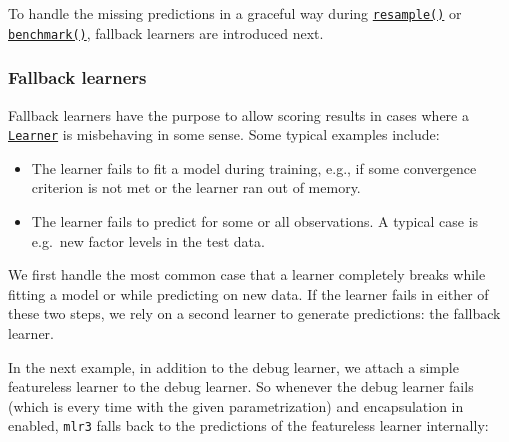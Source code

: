 \documentclass[]{article}
\newenvironment{Shaded}{\begin{snugshade}}{\end{snugshade}}
\newcommand{\DataTypeTok}[1]{\textcolor[rgb]{0.13,0.29,0.53}{#1}}
\newcommand{\DecValTok}[1]{\textcolor[rgb]{0.00,0.00,0.81}{#1}}
\newcommand{\KeywordTok}[1]{\textcolor[rgb]{0.13,0.29,0.53}{\textbf{#1}}}
\newcommand{\NormalTok}[1]{#1}
\newcommand{\OperatorTok}[1]{\textcolor[rgb]{0.81,0.36,0.00}{\textbf{#1}}}
\newcommand{\StringTok}[1]{\textcolor[rgb]{0.31,0.60,0.02}{#1}}
\providecommand{\tightlist}{%
  \setlength{\itemsep}{0pt}\setlength{\parskip}{0pt}}
\renewenvironment{Shaded} {\begin{snugshade}\small} {\end{snugshade}}
\begin{document}
To handle the missing predictions in a graceful way during \href{https://mlr3.mlr-org.com/reference/resample.html}{\texttt{resample()}} or \href{https://mlr3.mlr-org.com/reference/benchmark.html}{\texttt{benchmark()}}, fallback learners are introduced next.

\hypertarget{fallback-learners}{%
\subsubsection{Fallback learners}\label{fallback-learners}}

Fallback learners have the purpose to allow scoring results in cases where a \href{https://mlr3.mlr-org.com/reference/Learner.html}{\texttt{Learner}} is misbehaving in some sense.
Some typical examples include:

\begin{itemize}
\tightlist
\item
  The learner fails to fit a model during training, e.g., if some convergence criterion is not met or the learner ran out of memory.
\item
  The learner fails to predict for some or all observations.
  A typical case is e.g.~new factor levels in the test data.
\end{itemize}

We first handle the most common case that a learner completely breaks while fitting a model or while predicting on new data.
If the learner fails in either of these two steps, we rely on a second learner to generate predictions: the fallback learner.

In the next example, in addition to the debug learner, we attach a simple featureless learner to the debug learner.
So whenever the debug learner fails (which is every time with the given parametrization) and encapsulation in enabled, \texttt{mlr3} falls back to the predictions of the featureless learner internally:

\begin{Shaded}
\end{Shaded}
\end{document}

